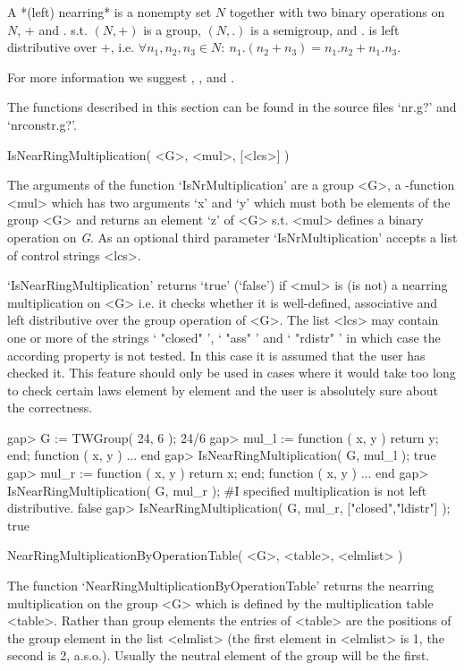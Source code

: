 %
%

A *(left) nearring* is a nonempty set $N$ together with two binary 
operations on $N$, $+$ and $.$ s.t. $(N,+)$ is a group, $(N,.)$ is 
a semigroup, and $.$ is left distributive over $+$, i.e. 
$\forall n_1,n_2,n_3 \in N:\ n_1.(n_2+n_3) = n_1.n_2 + n_1.n_3$.

For more information we suggest \cite{Pilz:Nearrings},
\cite{meldrum85:NATLWG}, and \cite{Clay:Nearrings}.


The functions described in this section can be found in the source files
`nr.g?' and `nrconstr.g?'.



\>IsNearRingMultiplication( <G>, <mul>, [<lcs>] )

The arguments of the function `Is\-Nr\-Mul\-ti\-pli\-ca\-tion' are a 
group <G>, a {\GAP}-function <mul> which has two arguments `x' and `y' which
must both be elements of the group <G> and returns an element `z' of <G> s.t.
<mul> defines a  binary operation on {\it G}. As an optional third parameter
`Is\-Nr\-Mul\-ti\-pli\-ca\-tion' accepts a list of control strings <lcs>.

`IsNearRingMultiplication' returns `true' (`false') if <mul> is (is not) a nearring
multiplication on <G> i.e. it checks whether it is well-defined, associative
and left distributive over the group operation of <G>. The list <lcs> may
contain one or more of the strings ` "closed" ', ` "ass" ' and ` "rdistr" '
in which case the according property is not tested. In this case it is
assumed that the user has checked it. This feature should only be used in cases
where it would take too long to check certain laws element by element and the
user is absolutely sure about the correctness.

\beginexample
    gap> G := TWGroup( 24, 6 );
    24/6
    gap> mul_l := function ( x, y ) return y; end;
    function ( x, y ) ... end
    gap> IsNearRingMultiplication( G, mul_l );
    true
    gap> mul_r := function ( x, y ) return x; end;
    function ( x, y ) ... end
    gap> IsNearRingMultiplication( G, mul_r );          
    #I  specified multiplication is not left distributive.
    false
    gap> IsNearRingMultiplication( G, mul_r, ["closed","ldistr"] );
    true
\endexample

\>NearRingMultiplicationByOperationTable( <G>, <table>, <elmlist> )

The function `NearRingMultiplicationByOperationTable' returns the nearring
multiplication on the group <G> which is defined by the multiplication table
<table>. Rather than group elements the entries of <table> are the positions
of the group element in the list <elmlist> (the first element in
<elmlist> is 1, the second is 2, a.s.o.). Usually the neutral element of the
group will be the first.

